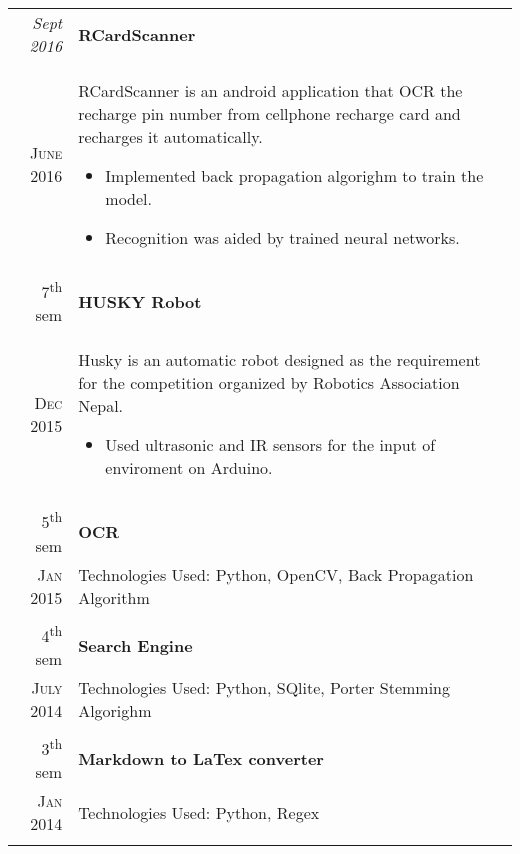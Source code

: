 \documentclass[a4paper,10pt]{article}
\begin{document}
\begin{tabular}{r|p{11cm}}
\emph{Sept 2016} & \textbf{RCardScanner}\\ \textsc{June 2016} & \small{RCardScanner is an android application that OCR the recharge pin number
from cellphone recharge card and recharges it automatically.
\footnotesize{
\begin{itemize}
\item Implemented back propagation algorighm to train the model.
\item Recognition was aided by trained neural networks.
\end{itemize}
}}\\\multicolumn{2}{c}{} \\

7\textsuperscript{th} sem & \textbf{HUSKY Robot}\\ \textsc{Dec 2015} & \small{Husky is an automatic robot designed as the requirement for the competition organized by Robotics Association Nepal.
\footnotesize{
\begin{itemize}
\item Used ultrasonic and IR sensors for the input of enviroment on Arduino.
\end{itemize}
}}\\\multicolumn{2}{c}{} \\

5\textsuperscript{th} sem & \textbf{OCR}\\ \textsc{Jan 2015} & \small{{Technologies Used: Python, OpenCV, Back Propagation Algorithm}}\\\multicolumn{2}{c}{} \\

4\textsuperscript{th} sem & \textbf{Search Engine}\\ \textsc{July 2014} & \small{Technologies Used: Python, SQlite, Porter Stemming Algorighm}\\\multicolumn{2}{c}{} \\

3\textsuperscript{th} sem & \textbf{Markdown to LaTex converter}\\ \textsc{Jan 2014} & \small{Technologies Used: Python, Regex}\\\multicolumn{2}{c}{} \\
\end{tabular}


\end{document}
